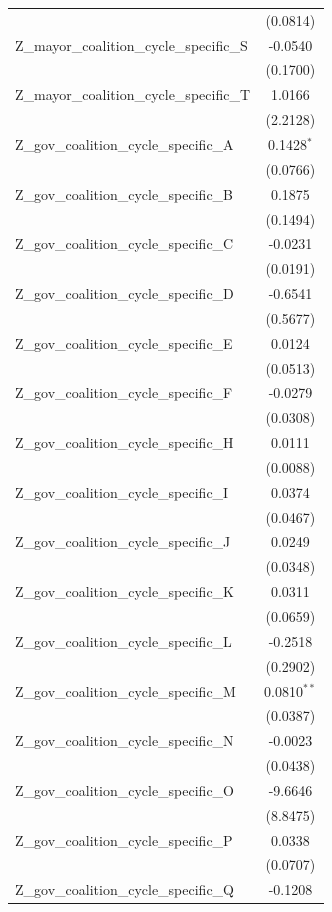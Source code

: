 \begin{tabular}{lc}
 & (0.0814) \\
Z\_mayor\_coalition\_cycle\_specific\_S & -0.0540 \\
 & (0.1700) \\
Z\_mayor\_coalition\_cycle\_specific\_T & 1.0166 \\
 & (2.2128) \\
Z\_gov\_coalition\_cycle\_specific\_A & 0.1428$^{*}$ \\
 & (0.0766) \\
Z\_gov\_coalition\_cycle\_specific\_B & 0.1875 \\
 & (0.1494) \\
Z\_gov\_coalition\_cycle\_specific\_C & -0.0231 \\
 & (0.0191) \\
Z\_gov\_coalition\_cycle\_specific\_D & -0.6541 \\
 & (0.5677) \\
Z\_gov\_coalition\_cycle\_specific\_E & 0.0124 \\
 & (0.0513) \\
Z\_gov\_coalition\_cycle\_specific\_F & -0.0279 \\
 & (0.0308) \\
Z\_gov\_coalition\_cycle\_specific\_H & 0.0111 \\
 & (0.0088) \\
Z\_gov\_coalition\_cycle\_specific\_I & 0.0374 \\
 & (0.0467) \\
Z\_gov\_coalition\_cycle\_specific\_J & 0.0249 \\
 & (0.0348) \\
Z\_gov\_coalition\_cycle\_specific\_K & 0.0311 \\
 & (0.0659) \\
Z\_gov\_coalition\_cycle\_specific\_L & -0.2518 \\
 & (0.2902) \\
Z\_gov\_coalition\_cycle\_specific\_M & 0.0810$^{**}$ \\
 & (0.0387) \\
Z\_gov\_coalition\_cycle\_specific\_N & -0.0023 \\
 & (0.0438) \\
Z\_gov\_coalition\_cycle\_specific\_O & -9.6646 \\
 & (8.8475) \\
Z\_gov\_coalition\_cycle\_specific\_P & 0.0338 \\
 & (0.0707) \\
Z\_gov\_coalition\_cycle\_specific\_Q & -0.1208 \\

\end{tabular}
